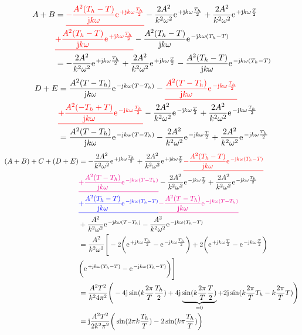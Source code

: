 \documentclass[11pt,a4paper,DIV=12]{scrartcl}
\newcommand{\ured}[1]{\textcolor{red}{\underline{#1}}}
\newcommand{\ublue}[1]{\textcolor{blue}{\underline{#1}}}
\newcommand{\umagenta}[1]{\textcolor{magenta}{\underline{#1}}}
\begin{document}
\begin{align}
	A+B&=\ured{-\frac{A^2(T_h-T)}{\im k \omega}\e^{+\im k \omega \frac{T_h}{2}}}-\frac{2A^2}{k^2\omega^2}\e^{+\im k \omega \frac{T_h}{2}}+\frac{2A^2}{k^2\omega^2}\e^{+\im k \omega \frac{T}{2}}\nonumber \\
	&\ured{+\frac{A^2(T_h-T)}{\im k \omega}\e^{+\im k \omega \frac{T_h}{2}}}-\frac{A^2(T_h-T)}{\im k \omega}\e^{-\im k \omega (T_h-T)}\nonumber \\
	&=-\frac{2A^2}{k^2\omega^2}\e^{+\im k \omega \frac{T_h}{2}}+\frac{2A^2}{k^2\omega^2}\e^{+\im k \omega \frac{T}{2}}-\frac{A^2(T_h-T)}{\im k \omega}\e^{-\im k \omega (T_h-T)}
\end{align}
\begin{align}
	D+E&=\frac{A^2(T-T_h)}{\im k \omega}\e^{-\im k \omega(T-T_h)}-\ured{\frac{A^2(T-T_h)}{\im k \omega}\e^{-\im k \omega \frac{T_h}{2}}}\nonumber \\
	&\ured{+\frac{A^2(-T_h+T)}{\im k \omega}\e^{-\im k\omega \frac{T_h}{2}}}-\frac{2A^2}{k^2\omega^2}\e^{-\im k \omega \frac{T}{2}}+\frac{2A^2}{k^2\omega^2}\e^{-\im k \omega \frac{T_h}{2}}\nonumber \\
	&=\frac{A^2(T-T_h)}{\im k \omega}\e^{-\im k \omega(T-T_h)}-\frac{2A^2}{k^2\omega^2}\e^{-\im k \omega \frac{T}{2}}+\frac{2A^2}{k^2\omega^2}\e^{-\im k \omega \frac{T_h}{2}}
\end{align}
\begin{align}
	(A+B)+C+(D+E)&=-\frac{2A^2}{k^2\omega^2}\e^{+\im k \omega \frac{T_h}{2}}+\frac{2A^2}{k^2\omega^2}\e^{+\im k \omega \frac{T}{2}}\ured{-\frac{A^2(T_h-T)}{\im k \omega}\e^{-\im k \omega (T_h-T)}}\nonumber \\
	&\umagenta{+\frac{A^2(T-T_h)}{\im k \omega}\e^{-\im k \omega(T-T_h)}}-\frac{2A^2}{k^2\omega^2}\e^{-\im k \omega \frac{T}{2}}+\frac{2A^2}{k^2\omega^2}\e^{-\im k \omega \frac{T_h}{2}}\nonumber\\
	&\ublue{+\frac{A^2(T_h-T)}{\im k \omega}\e^{-\im k \omega (T_h-T)}}\umagenta{-\frac{A^2(T-T_h)}{\im k \omega}\e^{-\im k \omega (T-T_h)}}\nonumber \\
	&+\frac{A^2}{k^2\omega^2}\e^{-\im k \omega (T-T_h)}-\frac{A^2}{k^2\omega^2}\e^{-\im k \omega (T_h-T)}\nonumber \\
	&=\frac{A^2}{k^2\omega^2}\Bigg [-2\bigg (\e^{+\im k \omega \frac{T_h}{2}}-\e^{-\im k \omega \frac{T_h}{2}}\bigg )+2\bigg (\e^{+\im k \omega \frac{T}{2}}-\e^{-\im k \omega \frac{T}{2}}\bigg )\nonumber \\
	&\bigg (\e^{+\im k \omega (T_h-T)}-\e^{-\im k \omega (T_h-T)}\bigg )\Bigg ]\nonumber \\
	&=\frac{A^2T^2}{k^24\pi^2}\Bigg (-4\im \sin(k\frac{2\pi}{T}\frac{T_h}{2})+4\im\underbrace{\sin(k\frac{2\pi}{T}\frac{T}{2})}_{=0}+2\im\sin(k\frac{2\pi}{T}T_h-k\frac{2\pi}{T}T)\Bigg )\nonumber \\
	&=\im\frac{A^2T^2}{2k^2\pi^2}\bigg (\sin(2\pi k\frac{T_h}{T})-2\sin(k\pi \frac{T_h}{T})\bigg )
\end{align}
\end{document}
